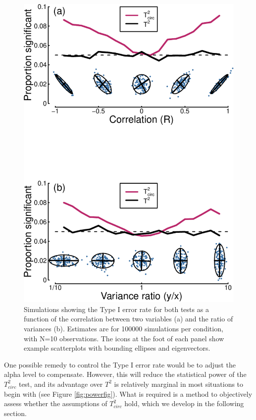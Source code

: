 \documentclass[]{article}
\begin{document}
\begin{figure}
\centering
\includegraphics{manuscript_files/figure-latex/falsealarms-1.pdf}
\caption{\label{fig:falsealarms}Simulations showing the Type I error rate for both tests as a function of the correlation between two variables (a) and the ratio of variances (b). Estimates are for 100000 simulations per condition, with N=10 observations. The icons at the foot of each panel show example scatterplots with bounding ellipses and eigenvectors.}
\end{figure}

One possible remedy to control the Type I error rate would be to adjust the alpha level to compensate. However, this will reduce the statistical power of the \(T^2_{circ}\) test, and its advantage over \(T^2\) is relatively marginal in most situations to begin with (see Figure \ref{fig:powerfig}). What is required is a method to objectively assess whether the assumptions of \(T^2_{circ}\) hold, which we develop in the following section.
\end{document}
